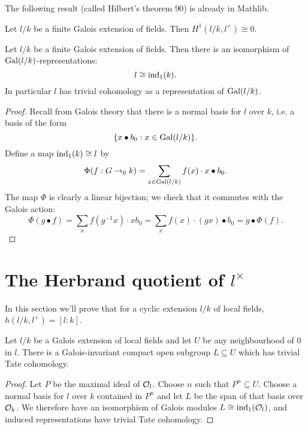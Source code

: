 The following result (called Hilbert's theorem 90) is already in Mathlib.

\begin{theorem}\label{thm:hilbert 90}
	\mathlibok
	Let $l/k$ be a finite Galois extension of fields.
	Then $H^1(l/k, l^\times) \cong 0$.
\end{theorem}

\begin{theorem}\label{thm:additive field trivial}
	Let $l/k$ be a finite Galois extension of fields.
	Then there is an isomorphism of $\mathrm{Gal}(l/k)$-representations:
	\[
		l \cong \mathrm{ind}_1(k).
	\]
	In particular $l$ has trivial cohomology as a representation of $\mathrm{Gal}(l/k)$.
\end{theorem}

\begin{proof}
	Recall from Galois theory that there is a normal basis for $l$ over $k$, i.e. a basis of the
	form
	\[
		\{x \bullet b_0 : x \in \mathrm{Gal}(l/k)\}.
	\]
	Define a map $\mathrm{ind}_1(k) \cong l$ by
	\[
		\Phi (f : G \to_0 k) = \sum_{x \in \mathrm{Gal}(l/k)} f(x) \cdot x \bullet b_0.
	\]
	The map $\Phi$ is clearly a linear bijection;
	we check that it commutes with the Galois action:
	\[
		\Phi(g\bullet f)
		= \sum_x f(g^{-1}x) \cdot x b_0
		= \sum_x f(x) \cdot (gx) \bullet b_0
		= g \bullet \Phi(f).
	\]
\end{proof}






\section{The Herbrand quotient of \texorpdfstring{$l^{\times}$}{l*}}

In this section we'll prove that for a cyclic extension $l/k$ of local fields,
$h(l/k,l^\times) = [l:k]$.

\begin{lemma}
	\label{lem:exists additive trivial}
	Let $l/k$ be a Galois extension of local fields and
	let $U$ be any neighbourhood of $0$ in $l$.
	There is a Galois-invariant compact open subgroup $L \subseteq U$
	which has trivial Tate cohomology.
\end{lemma}

\begin{proof}
	Let $P$ be the maximal ideal of ${\mathcal O}_l$.
	Choose $n$ such that $P^n \subseteq U$.
	Choose a normal basis for $l$ over $k$ contained in $P^n$
	and let $L$ be the span of that basis over ${\mathcal O}_k$.
	We therefore have an isomorphism of Galois modules $L \cong \mathrm{ind}_1({\mathcal O}_l)$,
	and induced representations have trivial Tate cohomology.
\end{proof}

